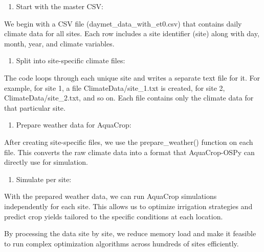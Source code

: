 \documentclass[
  letterpaper,
  DIV=11,
  numbers=noendperiod]{scrartcl}
\providecommand{\tightlist}{%
  \setlength{\itemsep}{0pt}\setlength{\parskip}{0pt}}\usepackage{longtable,booktabs,array}
\begin{document}
\begin{enumerate}
\def\labelenumi{\arabic{enumi}.}
\tightlist
\item
  Start with the master CSV:
\end{enumerate}

We begin with a CSV file (daymet\_data\_with\_et0.csv) that contains
daily climate data for all sites. Each row includes a site identifier
(site) along with day, month, year, and climate variables.

\begin{enumerate}
\def\labelenumi{\arabic{enumi}.}
\setcounter{enumi}{1}
\tightlist
\item
  Split into site-specific climate files:
\end{enumerate}

The code loops through each unique site and writes a separate text file
for it. For example, for site 1, a file ClimateData/site\_1.txt is
created, for site 2, ClimateData/site\_2.txt, and so on. Each file
contains only the climate data for that particular site.

\begin{enumerate}
\def\labelenumi{\arabic{enumi}.}
\setcounter{enumi}{2}
\tightlist
\item
  Prepare weather data for AquaCrop:
\end{enumerate}

After creating site-specific files, we use the prepare\_weather()
function on each file. This converts the raw climate data into a format
that AquaCrop-OSPy can directly use for simulation.

\begin{enumerate}
\def\labelenumi{\arabic{enumi}.}
\setcounter{enumi}{3}
\tightlist
\item
  Simulate per site:
\end{enumerate}

With the prepared weather data, we can run AquaCrop simulations
independently for each site. This allows us to optimize irrigation
strategies and predict crop yields tailored to the specific conditions
at each location.

By processing the data site by site, we reduce memory load and make it
feasible to run complex optimization algorithms across hundreds of sites
efficiently.
\end{document}
